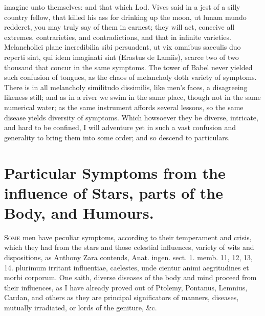 {imagine unto themselves: and that which Lod. Vives said in a jest
of a silly country fellow, that killed his ass for drinking up the
moon, ut lunam mundo redderet, you may truly say of them in earnest;
they will act, conceive all extremes, contrarieties, and
contradictions, and that in infinite varieties. Melancholici plane
incredibilia sibi persuadent, ut vix omnibus saeculis duo reperti sint,
qui idem imaginati sint (Erastus de Lamiis), scarce two of two thousand
that concur in the same symptoms. The tower of Babel never yielded such
confusion of tongues, as the chaos of melancholy doth variety of
symptoms. There is in all melancholy similitudo dissimilis, like men's
faces, a disagreeing likeness still; and as in a river we swim in the
same place, though not in the same numerical water; as the same
instrument affords several lessons, so the same disease yields
diversity of symptoms. Which howsoever they be diverse, intricate, and
hard to be confined, I will adventure yet in such a vast confusion and
generality to bring them into some order; and so descend to
particulars.

\section[Symptoms from the influence of Stars]{Particular Symptoms from the influence of Stars, parts of the Body, and Humours.}

\lettrine{S}{ome} men have peculiar symptoms, according to their temperament and
crisis, which they had from the stars and those celestial influences,
variety of wits and dispositions, as Anthony Zara contends, Anat.
ingen. sect. 1. memb. 11, 12, 13, 14. plurimum irritant influentiae,
caelestes, unde cientur animi aegritudines et morbi corporum. One
saith, diverse diseases of the body and mind proceed from their
influences, as I have already proved out of Ptolemy, Pontanus,
Lemnius, Cardan, and others as they are principal significators of
manners, diseases, mutually irradiated, or lords of the geniture, \&c.

}
